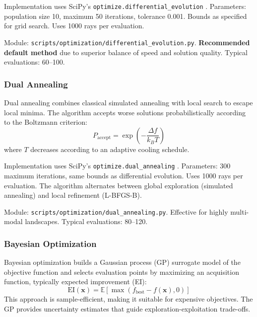 Implementation uses SciPy's \texttt{optimize.}\allowbreak\texttt{differential\_evolution} \cite{scipy}. Parameters: population size 10, maximum 50 iterations, tolerance 0.001. Bounds as specified for grid search. Uses 1000 rays per evaluation.

Module: \texttt{scripts/optimization/differential\_evolution.py}. \textbf{Recommended default method} due to superior balance of speed and solution quality. Typical evaluations: 60--100.

\subsubsection{Dual Annealing}

Dual annealing \cite{xiang2013,xiang2000} combines classical simulated annealing with local search to escape local minima. The algorithm accepts worse solutions probabilistically according to the Boltzmann criterion:
\begin{equation}
P_{\text{accept}} = \exp\left(-\frac{\Delta f}{k_B T}\right)
\end{equation}
where $T$ decreases according to an adaptive cooling schedule.

Implementation uses SciPy's \texttt{optimize.}\allowbreak\texttt{dual\_annealing} \cite{scipy}. Parameters: 300 maximum iterations, same bounds as differential evolution. Uses 1000 rays per evaluation. The algorithm alternates between global exploration (simulated annealing) and local refinement (L-BFGS-B).

Module: \texttt{scripts/optimization/dual\_annealing.py}. Effective for highly multi-modal landscapes. Typical evaluations: 80--120.

\subsubsection{Bayesian Optimization}

Bayesian optimization \cite{mockus1978,jones1998} builds a Gaussian process (GP) surrogate model of the objective function and selects evaluation points by maximizing an acquisition function, typically expected improvement (EI):
\begin{equation}
\text{EI}(\mathbf{x}) = \mathbb{E}[\max(f_{\text{best}} - f(\mathbf{x}), 0)]
\end{equation}
This approach is sample-efficient, making it suitable for expensive objectives. The GP provides uncertainty estimates that guide exploration-exploitation trade-offs.


